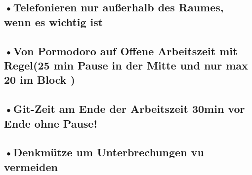 \subsection{•Telefonieren nur außerhalb des Raumes, wenn es wichtig ist}
\subsection{•Von Pormodoro auf Offene Arbeitszeit mit Regel(25 min Pause in der Mitte und nur max 20 im Block )}
\subsection{•Git-Zeit am Ende der Arbeitszeit 30min vor Ende ohne Pause!}
\subsection{•Denkmütze um Unterbrechungen vu vermeiden}



